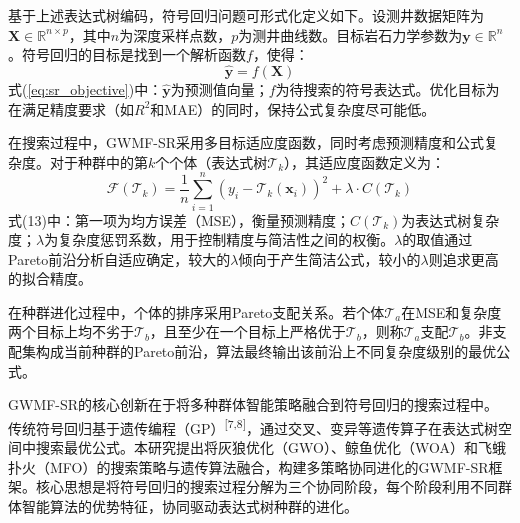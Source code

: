 \documentclass[a4paper,12pt]{ctexart}
\begin{document}
基于上述表达式树编码，符号回归问题可形式化定义如下。设测井数据矩阵为$\mathbf{X} \in \mathbb{R}^{n \times p}$，其中$n$为深度采样点数，$p$为测井曲线数。目标岩石力学参数为$\mathbf{y} \in \mathbb{R}^{n}$。符号回归的目标是找到一个解析函数$f$，使得：
\begin{equation}
  \hat{\mathbf{y}} = f(\mathbf{X}) \tag{1}
  \label{eq:sr_objective}
\end{equation}
式(\ref{eq:sr_objective})中：$\hat{\mathbf{y}}$为预测值向量；$f$为待搜索的符号表达式。优化目标为在满足精度要求（如$R^2$和MAE）的同时，保持公式复杂度尽可能低。

在搜索过程中，GWMF-SR采用多目标适应度函数，同时考虑预测精度和公式复杂度。对于种群中的第$k$个个体（表达式树$\mathcal{T}_k$），其适应度函数定义为：
\begin{equation}
\mathcal{F}(\mathcal{T}_k) = \frac{1}{n}\sum_{i=1}^{n}(y_i - \mathcal{T}_k(\mathbf{x}_i))^2 + \lambda \cdot C(\mathcal{T}_k) \tag{13}
\end{equation}
式(13)中：第一项为均方误差（MSE），衡量预测精度；$C(\mathcal{T}_k)$为表达式树复杂度；$\lambda$为复杂度惩罚系数，用于控制精度与简洁性之间的权衡。$\lambda$的取值通过Pareto前沿分析自适应确定，较大的$\lambda$倾向于产生简洁公式，较小的$\lambda$则追求更高的拟合精度。

在种群进化过程中，个体的排序采用Pareto支配关系。若个体$\mathcal{T}_a$在MSE和复杂度两个目标上均不劣于$\mathcal{T}_b$，且至少在一个目标上严格优于$\mathcal{T}_b$，则称$\mathcal{T}_a$支配$\mathcal{T}_b$。非支配集构成当前种群的Pareto前沿，算法最终输出该前沿上不同复杂度级别的最优公式。

GWMF-SR的核心创新在于将多种群体智能策略融合到符号回归的搜索过程中。传统符号回归基于遗传编程（GP）\textsuperscript{[7,8]}，通过交叉、变异等遗传算子在表达式树空间中搜索最优公式。本研究提出将灰狼优化（GWO）、鲸鱼优化（WOA）和飞蛾扑火（MFO）的搜索策略与遗传算法融合，构建多策略协同进化的GWMF-SR框架。核心思想是将符号回归的搜索过程分解为三个协同阶段，每个阶段利用不同群体智能算法的优势特征，协同驱动表达式树种群的进化。
\end{document}
